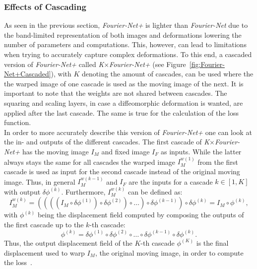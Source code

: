 \subsubsection{Effects of Cascading} \label{SubSubSec:EffectsCascading}
As seen in the previous section, \emph{Fourier-Net+} is lighter than \emph{Fourier-Net} due to the band-limited representation of both images and deformations lowering the number of parameters and computations. This, however, can lead to limitations when trying to accurately capture complex deformations. To this end, a cascaded version of \emph{Fourier-Net+} called \emph{K$\times$Fourier-Net+} (see Figure~\ref{fig:Fourier-Net+Cascaded}), with $K$ denoting the amount of cascades, can be used where the the warped image of one cascade is used as the moving image of the next. It is important to note that the weights are not shared between cascades. The squaring and scaling layers, in case a diffeomorphic deformation is wanted, are applied after the last cascade. The same is true for the calculation of the loss function.\\
In order to more accurately describe this version of \emph{Fourier-Net+} one can look at the in- and outputs of the different cascades. The first cascade of \emph{K$\times$Fourier-Net+} has the moving image $I_M$ and fixed image $I_F$ as inputs. While the latter always stays the same for all cascades the warped image $I_M^{w(1)}$ from the first cascade is used as input for the second cascade instead of the original moving image. Thus, in general $I_M^{w(k-1)}$ and $I_F$ are the inputs for a cascade $k \in [1, K]$ with output $\delta \phi^{(k)}$. Furthermore, $I_M^{w(k)}$ can be defined as:
\begin{equation}
	I_M^{w(k)} = ((((I_M \circ \delta \phi^{(1)}) \circ \delta \phi^{(2)}) \circ \dots ) \circ \delta \phi^{(k-1)}) \circ \delta \phi^{(k)} = I_M \circ  \phi^{(k)},
\end{equation}
with $\phi^{(k)}$ being the displacement field computed by composing the outputs of the first cascade up to the $k$-th cascade:
\begin{equation}
	\phi^{(k)} = \delta \phi^{(1)} \circ \delta \phi^{(2)} \circ \dots \circ \delta \phi^{(k-1)} \circ \delta \phi^{(k)}.
\end{equation}
Thus, the output displacement field of the $K$-th cascade $\phi^{(K)}$ is the final displacement used to warp $I_M$, the original moving image, in order to compute the loss~\cite{Fourier-Net+}.


